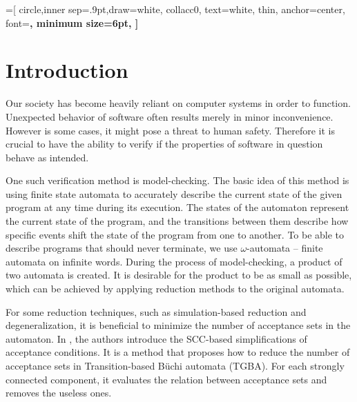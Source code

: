 \documentclass[
  digital, %
  twoside, %
  table,   %
  lof,     %
  lot,     %
]{fithesis3}
\begin{document}

=[
  circle,inner sep=.9pt,draw=white,
  collacc0, text=white,
  thin,
  anchor=center,
  font=\bfseries\sffamily\scriptsize,
  minimum size={6pt},
]

\newcommand{\accmarkblue}{\begin{tikzpicture} \node[accset, collacc0] {}; \end{tikzpicture}}
\newcommand{\accmarkmag}{\begin{tikzpicture} \node[accset, collacc1] {}; \end{tikzpicture}}
\newcommand{\accmarkor}{\begin{tikzpicture} \node[accset, collacc2] {}; \end{tikzpicture}}

\chapter{Introduction}

Our society has become heavily reliant on computer systems in order to function. Unexpected behavior of software often results merely in minor inconvenience. However is some cases, it might pose a threat to human safety. Therefore it is crucial to have the ability to verify if the properties of software in question behave as intended. 

One such verification method is model-checking. The basic idea of this method is using finite state automata to accurately describe the current state of the given program at any time during its execution. The states of the automaton represent the current state of the program, and the transitions between them describe how specific events shift the state of the program from one to another. To be able to describe programs that should never terminate, we use $\omega$-automata -- finite automata on infinite words. During the process of model-checking, a product of two automata is created. It is desirable for the product to be as small as possible, which can be achieved by applying reduction methods to the original automata. 

For some reduction techniques, such as simulation-based reduction and degeneralization, it is beneficial to minimize the number of acceptance sets in the automaton. In \cite{spin2013}, the authors introduce the SCC-based simplifications of acceptance conditions. It is a method that proposes how to reduce the number of acceptance sets in Transition-based Büchi automata (TGBA). For each strongly connected component, it evaluates the relation between acceptance sets and removes the useless ones. 
\end{document}
